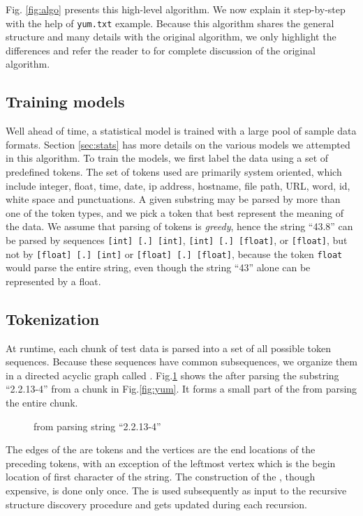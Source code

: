 Fig. \ref{fig:algo} presents this high-level algorithm. We now explain
it step-by-step with the help of {\tt yum.txt} example.
Because this algorithm shares the general structure and many details with
the original algorithm, we only highlight the differences and
refer the reader to \cite{fisher+:dirttoshovels} for complete discussion of
the original algorithm.

\subsection{Training models}
Well ahead of time, a statistical model is trained with
a large pool of sample data formats. Section \ref{sec:stats} has more details
on the various models we attempted in this algorithm. To train the models,
we first label the data using a set of predefined tokens. The set of tokens
used are primarily system oriented, which include
integer, float, time, date, ip address, hostname, file path, URL, 
word, id, white space and punctuations. 
A given substring may be parsed by more than one of the token
types, and we pick a token that best represent the meaning of the data.
We assume that parsing of tokens is {\em greedy}, hence
the string ``43.8'' can be parsed by sequences 
{\tt [int] [.] [int]}, {\tt [int] [.] [float]}, or {\tt [float]},
but not by {\tt [float] [.] [int]} or {\tt [float] [.] [float]},
because the token {\tt float} would parse the entire string, even though
the string ``43'' alone can be represented by a float.

\subsection{Tokenization}
At runtime, each chunk of test data is parsed into a set of all possible 
token sequences. Because these sequences have
common subsequences, we organize them in a directed acyclic graph
called \seqset. Fig.\ref{fig:seqset} shows the \seqset{} after parsing 
the substring ``2.2.13-4'' from a chunk in Fig.\ref{fig:yum}. It 
forms a small part of the \seqset{} from parsing the entire chunk.

\begin{figure}[th]
\begin{center}
\end{center}
\caption{\seqset{} from parsing string ``2.2.13-4''}\label{fig:seqset}
\end{figure}

The edges of the \seqset{} are tokens and the vertices are the end locations
of the preceding tokens, with an exception of the leftmost vertex which
is the begin location of first character of the string.
The construction of the \seqset, though expensive, is done only once.
The \seqset{} is used subsequently as input to the recursive 
structure discovery procedure and gets updated during each recursion.

